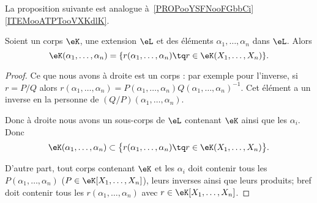 La proposition suivante est analogue à~\ref{PROPooYSFNooFGbbCi}\ref{ITEMooATPTooVXKdlK}.

\begin{lemma}        \label{LEMooQEJHooAmSNxU}
    Soient un corps \( \eK\), une extension \( \eL\) et des éléments \( \alpha_1,\ldots, \alpha_n\) dans \( \eL\). Alors
    \begin{equation}
        \eK(\alpha_1,\ldots, \alpha_n)=\{ r(\alpha_1,\ldots, \alpha_n)\tq r\in \eK(X_1,\ldots, X_n) \}.
    \end{equation}
\end{lemma}

\begin{proof}
    Ce que nous avons à droite est un corps : par exemple pour l'inverse, si \( r=P/Q\) alors \( r(\alpha_1,\ldots,\alpha_n)=P(\alpha_1,\ldots, \alpha_n)Q(\alpha_1,\ldots, \alpha_n)^{-1}\). Cet élément a un inverse en la personne de \( (Q/P)(\alpha_1,\ldots, \alpha_n)\).

    Donc à droite nous avons un sous-corps de \( \eL\) contenant \( \eK\) ainsi que les \( \alpha_i\). Donc
    \begin{equation}
        \eK(\alpha_1,\ldots, \alpha_n)\subset \big\{ r(\alpha_1,\ldots, \alpha_n)\tq r\in \eK(X_1,\ldots, X_n) \big\}.
    \end{equation}

    D'autre part, tout corps contenant \( \eK\) et les \( \alpha_i\) doit contenir tous les \( P(\alpha_1,\ldots, \alpha_n)\) (\( P\in \eK[X_1,\ldots, X_n]\)), leurs inverses ainsi que leurs produits; bref doit contenir tous les \( r(\alpha_1,\ldots, \alpha_n)\) avec \( r\in\eK[X_1,\ldots, X_n]\).
\end{proof}

